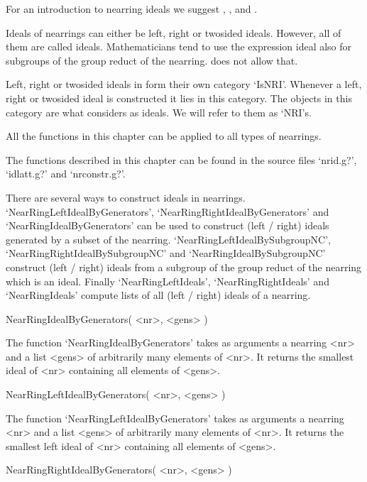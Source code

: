 %
%

For an introduction to nearring ideals we suggest \cite{Pilz:Nearrings},
\cite{meldrum85:NATLWG}, and \cite{Clay:Nearrings}.

Ideals of nearrings can either be left, right or twosided ideals. However,
all of them are called ideals. Mathematicians tend to use the expression
ideal also for subgroups of the group reduct of the nearring. {\GAP} does
not allow that.

Left, right or twosided ideals in {\GAP} form their own category `IsNRI'.
Whenever a left, right or twosided ideal is constructed it lies in this
category. The objects in this category are what {\GAP} considers as ideals.
We will refer to them as `NRI's.

All the functions in this chapter can be applied to all types of nearrings.

The functions described in this chapter can be found in the source files
`nrid.g?', `idlatt.g?' and `nrconstr.g?'.



There are several ways to construct ideals in nearrings.
`NearRingLeftIdealByGenerators', `NearRingRightIdealByGenerators' and
`NearRingIdealByGenerators' can be used to construct (left / right)
ideals generated by a subset of the nearring.
`NearRingLeftIdealBySubgroupNC', `NearRingRightIdealBySubgroupNC' and
`NearRingIdealBySubgroupNC' construct (left / right) ideals from a subgroup
of the group reduct of the nearring which is an ideal. Finally
`NearRingLeftIdeals', `NearRingRightIdeals' and `NearRingIdeals'
compute lists of all (left / right) ideals of a nearring.

\>NearRingIdealByGenerators( <nr>, <gens> )

The function `NearRingIdealByGenerators' takes as arguments a nearring <nr>
and a list <gens> of arbitrarily many elements of <nr>. It returns the
smallest ideal of <nr> containing all elements of <gens>.

\>NearRingLeftIdealByGenerators( <nr>, <gens> )

The function `NearRingLeftIdealByGenerators' takes as arguments a nearring <nr>
and a list <gens> of arbitrarily many elements of <nr>. It returns the
smallest left ideal of <nr> containing all elements of <gens>.

\>NearRingRightIdealByGenerators( <nr>, <gens> )

